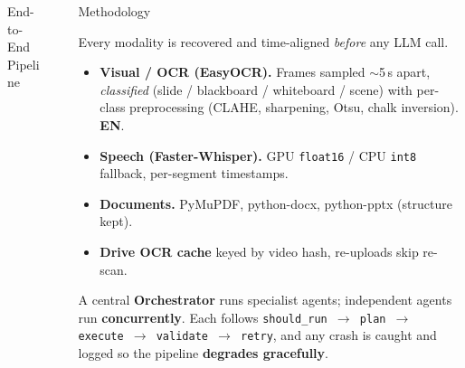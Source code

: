 \documentclass[final]{beamer}
\newlength{\sepwidth}
\newlength{\colwidth}
\newcommand{\separatorcolumn}{\begin{column}{\sepwidth}\end{column}}
\begin{document}
\begin{frame}[t]
\begin{columns}[t]
\begin{column}{\colwidth}
\begin{block}{End-to-End Pipeline}
  \end{block}

\end{column}

\separatorcolumn

\begin{column}{\colwidth}

  \begin{block}{Methodology}


    Every modality is recovered and time-aligned \emph{before} any LLM call.

    \begin{itemize}
      \item \textbf{Visual / OCR (EasyOCR).} Frames sampled $\sim$5\,s apart,
        \emph{classified} (slide / blackboard / whiteboard / scene) with per-class
        preprocessing (CLAHE, sharpening, Otsu, chalk inversion). \textbf{EN}.
      \item \textbf{Speech (Faster-Whisper).} GPU \texttt{float16} / CPU
        \texttt{int8} fallback, per-segment timestamps.
      \item \textbf{Documents.} PyMuPDF, python-docx, python-pptx (structure kept).
      \item \textbf{Drive OCR cache} keyed by video hash, re-uploads skip re-scan.
    \end{itemize}


    A central \textbf{Orchestrator} runs specialist agents; independent agents run
    \textbf{concurrently}. Each follows
    \texttt{should\_run $\to$ plan $\to$ execute $\to$ validate $\to$ retry}, and
    any crash is caught and logged so the pipeline \textbf{degrades gracefully}.

    \begin{figure}
      \centering
\end{figure}
\end{block}
\end{column}
\end{columns}
\end{frame}
\end{document}
